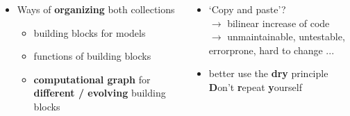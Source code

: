 \documentclass[unknownkeysallowed,usepdftitle=false]{beamer}
\newcommand{\secvariable}{nothing}
\newcommand{\mysection}[1]{\renewcommand{\secvariable}{#1}
}
\begin{document}
\begin{frame}
\begin{columns}
\begin{column}{0.5\textwidth}
\begin{itemize}
\begin{itemize}
         \end{itemize}
         \item<8->Ways of {\bf organizing} both collections 
          \begin{itemize}
            \item<9-> building blocks for models
            \item<10-> functions of building blocks 
            \item<11> {\bf computational graph} for {\bf different / evolving} building blocks 
          \end{itemize}
      \end{itemize}
    \end{column}
    \begin{column}{0.5\textwidth}
      \begin{itemize}
        \item<5->
        `Copy and paste'? \\
          $\rightarrow$ bilinear increase of code
          \\
          $\rightarrow$ unmaintainable, untestable, errorprone, 
          hard to change ... 
          \item<6-> better use the {\bf dry} principle
          {\bf D}on't {\bf r}epeat {\bf y}ourself 
        \end{itemize}
      \end{column}
    \end{columns}
  \end{frame}
      

  \mysection{Screen Shots}\label{screenshots}
\end{document}
